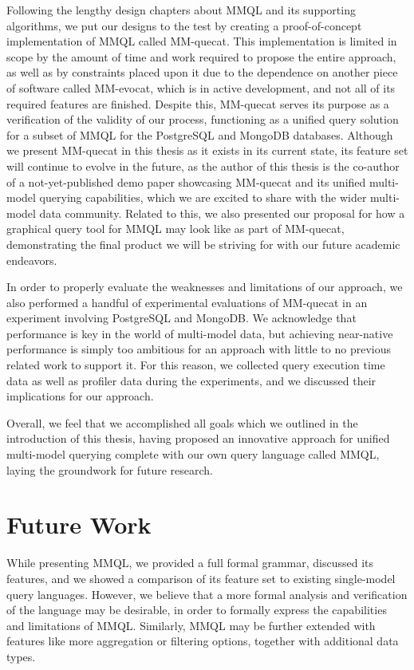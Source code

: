 Following the lengthy design chapters about MMQL and its supporting algorithms, we put our designs to the test by creating a proof-of-concept implementation of MMQL called MM-quecat.
This implementation is limited in scope by the amount of time and work required to propose the entire approach, as well as by constraints placed upon it due to the dependence on another piece of software called MM-evocat, which is in active development, and not all of its required features are finished.
Despite this, MM-quecat serves its purpose as a verification of the validity of our process, functioning as a unified query solution for a subset of MMQL for the PostgreSQL and MongoDB databases.
Although we present MM-quecat in this thesis as it exists in its current state, its feature set will continue to evolve in the future, as the author of this thesis is the co-author of a not-yet-published demo paper showcasing MM-quecat and its unified multi-model querying capabilities, which we are excited to share with the wider multi-model data community.
Related to this, we also presented our proposal for how a graphical query tool for MMQL may look like as part of MM-quecat, demonstrating the final product we will be striving for with our future academic endeavors.

In order to properly evaluate the weaknesses and limitations of our approach, we also performed a handful of experimental evaluations of MM-quecat in an experiment involving PostgreSQL and MongoDB.
We acknowledge that performance is key in the world of multi-model data, but achieving near-native performance is simply too ambitious for an approach with little to no previous related work to support it.
For this reason, we collected query execution time data as well as profiler data during the experiments, and we discussed their implications for our approach.

Overall, we feel that we accomplished all goals which we outlined in the introduction of this thesis, having proposed an innovative approach for unified multi-model querying complete with our own query language called MMQL, laying the groundwork for future research.

\chapter*{Future Work}

While presenting MMQL, we provided a full formal grammar, discussed its features, and we showed a comparison of its feature set to existing single-model query languages.
However, we believe that a more formal analysis and verification of the language may be desirable, in order to formally express the capabilities and limitations of MMQL.
Similarly, MMQL may be further extended with features like more aggregation or filtering options, together with additional data types.

